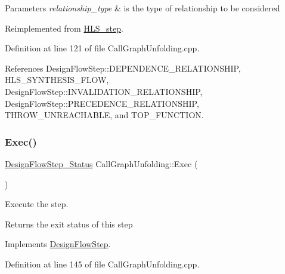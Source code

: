 \begin{DoxyParams}{Parameters}
{\em relationship\+\_\+type} & is the type of relationship to be considered \\
\hline
\end{DoxyParams}


Reimplemented from \hyperlink{classHLS__step_aed0ce8cca9a1ef18e705fc1032ad4de5}{H\+L\+S\+\_\+step}.



Definition at line 121 of file Call\+Graph\+Unfolding.\+cpp.



References Design\+Flow\+Step\+::\+D\+E\+P\+E\+N\+D\+E\+N\+C\+E\+\_\+\+R\+E\+L\+A\+T\+I\+O\+N\+S\+H\+IP, H\+L\+S\+\_\+\+S\+Y\+N\+T\+H\+E\+S\+I\+S\+\_\+\+F\+L\+OW, Design\+Flow\+Step\+::\+I\+N\+V\+A\+L\+I\+D\+A\+T\+I\+O\+N\+\_\+\+R\+E\+L\+A\+T\+I\+O\+N\+S\+H\+IP, Design\+Flow\+Step\+::\+P\+R\+E\+C\+E\+D\+E\+N\+C\+E\+\_\+\+R\+E\+L\+A\+T\+I\+O\+N\+S\+H\+IP, T\+H\+R\+O\+W\+\_\+\+U\+N\+R\+E\+A\+C\+H\+A\+B\+LE, and T\+O\+P\+\_\+\+F\+U\+N\+C\+T\+I\+ON.

\mbox{\label{classCallGraphUnfolding_a22a28a943380b9859f6006542f1929ab}} 
\subsubsection{\texorpdfstring{Exec()}{Exec()}}
{\footnotesize\ttfamily \hyperlink{design__flow__step_8hpp_afb1f0d73069c26076b8d31dbc8ebecdf}{Design\+Flow\+Step\+\_\+\+Status} Call\+Graph\+Unfolding\+::\+Exec (\begin{DoxyParamCaption}{ }\end{DoxyParamCaption})\hspace{0.3cm}{\ttfamily [virtual]}}



Execute the step. 

\begin{DoxyReturn}{Returns}
the exit status of this step 
\end{DoxyReturn}


Implements \hyperlink{classDesignFlowStep_a77d7e38493016766098711ea24f60b89}{Design\+Flow\+Step}.



Definition at line 145 of file Call\+Graph\+Unfolding.\+cpp.



